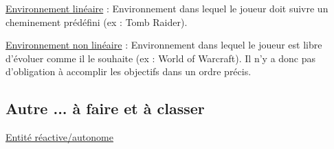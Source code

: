 \underline{Environnement linéaire} : 
Environnement dans lequel le joueur doit suivre un cheminement prédéfini (ex : Tomb Raider).

\underline{Environnement non linéaire} : 
Environnement dans lequel le joueur est libre d'évoluer comme il le souhaite (ex : World of Warcraft). 
Il n'y a donc pas d'obligation à accomplir les objectifs dans un ordre précis.


\subsection*{Autre ... à faire et à classer}


\underline{Entité réactive/autonome}

